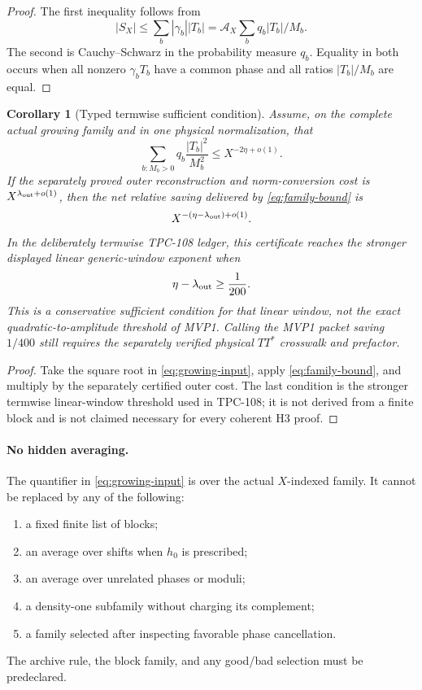 \documentclass[11pt]{article}
\newtheorem{corollary}[theorem]{Corollary}
\theoremstyle{definition}
\theoremstyle{remark}
\begin{document}
\begin{proof}
The first inequality follows from
\[
 |S_X|\le\sum_b|\gamma_b||T_b|
 =\mathcal A_X\sum_bq_b|T_b|/M_b.
\]
The second is Cauchy--Schwarz in the probability measure \(q_b\).
Equality in both occurs when all nonzero \(\gamma_bT_b\) have a
common phase and all ratios \(|T_b|/M_b\) are equal.
\end{proof}

\begin{corollary}[Typed termwise sufficient condition]
\label{cor:h3}
Assume, on the complete actual growing family and in one physical
normalization, that
\begin{equation}
 \sum_{b:M_b>0}
 q_b\frac{|T_b|^2}{M_b^2}
 \le X^{-2\eta+o(1)}.
 \label{eq:growing-input}
\end{equation}
If the separately proved outer reconstruction and norm-conversion
cost is \(X^{\lambda_{\rm out}+o(1)}\), then the net relative saving
delivered by \eqref{eq:family-bound} is
\[
 X^{-(\eta-\lambda_{\rm out})+o(1)}.
\]
In the deliberately termwise TPC-108 ledger, this certificate reaches
the stronger displayed \emph{linear generic-window} exponent when
\begin{equation}
 \eta-\lambda_{\rm out}\ge\frac1{200}.
 \label{eq:h3-threshold}
\end{equation}
This is a conservative sufficient condition for that linear window,
not the exact quadratic-to-amplitude threshold of MVP1.  Calling the
MVP1 packet saving \(1/400\) still requires the separately verified
physical \(TT^*\) crosswalk and prefactor.
\end{corollary}

\begin{proof}
Take the square root in \eqref{eq:growing-input}, apply
\eqref{eq:family-bound}, and multiply by the separately certified
outer cost.  The last condition is the stronger termwise
linear-window threshold used in TPC-108; it is not derived from a
finite block and is not claimed necessary for every coherent H3
proof.
\end{proof}

\paragraph{No hidden averaging.}
The quantifier in \eqref{eq:growing-input} is over the actual
\(X\)-indexed family.  It cannot be replaced by any of the following:
\begin{enumerate}[label=(\alph*),leftmargin=2em]
\item a fixed finite list of blocks;
\item an average over shifts when \(h_0\) is prescribed;
\item an average over unrelated phases or moduli;
\item a density-one subfamily without charging its complement;
\item a family selected after inspecting favorable phase
  cancellation.
\end{enumerate}
The archive rule, the block family, and any good/bad selection must be
predeclared.
\end{document}
